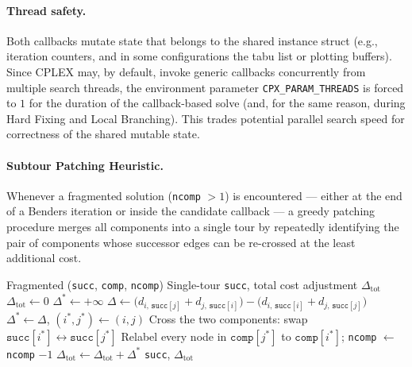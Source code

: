 \documentclass{article}
\begin{document}
\paragraph{Thread safety.}
Both callbacks mutate state that belongs to the shared instance struct (e.g., iteration
counters, and in some configurations the tabu list or plotting buffers). Since CPLEX may, by
default, invoke generic callbacks concurrently from multiple search threads, the environment
parameter \texttt{CPX\_PARAM\_THREADS} is forced to $1$ for the duration of the callback-based
solve (and, for the same reason, during Hard Fixing and Local Branching). This trades
potential parallel search speed for correctness of the shared mutable state.

\paragraph{Subtour Patching Heuristic.}
Whenever a fragmented solution (\texttt{ncomp} $> 1$) is encountered --- either at the end of a
Benders iteration or inside the candidate callback --- a greedy patching procedure merges all
components into a single tour by repeatedly identifying the pair of components whose
successor edges can be re-crossed at the least additional cost.

\begin{algorithm}[H]
\caption{Subtour Patching Heuristic (\texttt{apply\_patching})}
\label{alg:patching}
\begin{algorithmic}[1]
\Require Fragmented (\texttt{succ}, \texttt{comp}, \texttt{ncomp})
\Ensure Single-tour \texttt{succ}, total cost adjustment $\Delta_{\text{tot}}$
\State $\Delta_{\text{tot}} \leftarrow 0$
    \State $\Delta^* \leftarrow +\infty$
        \State $\Delta \leftarrow \bigl(d_{i,\,\texttt{succ}[j]} + d_{j,\,\texttt{succ}[i]}\bigr) - \bigl(d_{i,\,\texttt{succ}[i]} + d_{j,\,\texttt{succ}[j]}\bigr)$
        \If{$\Delta < \Delta^*$}
            \State $\Delta^* \leftarrow \Delta$, $(i^*, j^*) \leftarrow (i, j)$
        \EndIf
    \EndFor
    \State Cross the two components: swap $\texttt{succ}[i^*] \leftrightarrow \texttt{succ}[j^*]$
    \State Relabel every node in $\texttt{comp}[j^*]$ to $\texttt{comp}[i^*]$; \texttt{ncomp} $\leftarrow$ \texttt{ncomp} $- 1$
    \State $\Delta_{\text{tot}} \leftarrow \Delta_{\text{tot}} + \Delta^*$
\EndWhile
\State \Return \texttt{succ}, $\Delta_{\text{tot}}$
\end{algorithmic}
\end{algorithm}
\end{document}
